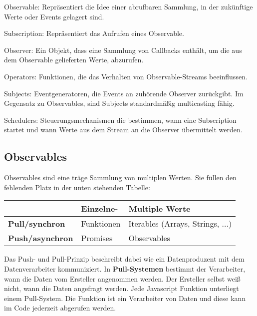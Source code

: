 \begin{description}
    \item Observable: Repräsentiert die Idee einer abrufbaren Sammlung, in der zukünftige Werte oder Events gelagert sind.
    \item Subscription: Repräsentiert das Aufrufen eines Observable.
    \item Observer: Ein Objekt, dass eine Sammlung von Callbacks enthält, um die aus dem Observable gelieferten Werte, abzurufen.
    \item Operators: Funktionen, die das Verhalten von Observable-Streams beeinflussen.
    \item Subjects: Eventgeneratoren, die Events an zuhörende Observer zurückgibt. Im Gegensatz zu Observables, sind Subjects standardmäßig multicasting fähig.
    \item Schedulers: Steuerungsmechanismen die bestimmen, wann eine Subscription startet und wann Werte aus dem Stream an die Observer übermittelt werden.
\end{description}


\subsection{Observables}

Observables sind eine träge Sammlung von multiplen Werten. Sie füllen den fehlenden Platz in der unten stehenden Tabelle:

\begin{center}
    \begin{tabular}{| l | l | l |}
    \hline
    & \textbf{Einzelne-} & \textbf{Multiple Werte} \\ \hline
    \textbf{Pull/synchron} & Funktionen & Iterables (Arrays, Strings, ...) \\ \hline
    \textbf{Push/asynchron} & Promises & Observables  \\ \hline
    \end{tabular}
\end{center}

\noindent
Das Push- und Pull-Prinzip beschreibt dabei wie ein Datenproduzent mit dem Datenverarbeiter kommuniziert. In \textbf{Pull-Systemen} bestimmt der Verarbeiter, wann die Daten vom Ersteller angenommen werden. Der Ersteller selbst weiß nicht, wann die Daten angefragt werden. Jede Javascript Funktion unterliegt einem Pull-System. Die Funktion ist ein Verarbeiter von Daten und diese kann im Code jederzeit abgerufen werden.\\


